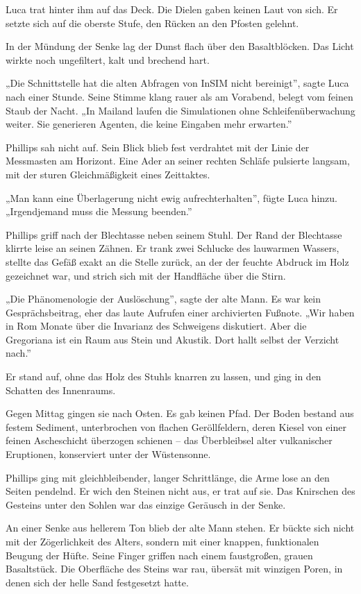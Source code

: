 \documentclass[
  ngerman,
]{article}
\begin{document}
Luca trat hinter ihm auf das Deck. Die Dielen gaben keinen Laut von
sich. Er setzte sich auf die oberste Stufe, den Rücken an den Pfosten
gelehnt.

In der Mündung der Senke lag der Dunst flach über den Basaltblöcken. Das
Licht wirkte noch ungefiltert, kalt und brechend hart.

„Die Schnittstelle hat die alten Abfragen von InSIM nicht bereinigt'',
sagte Luca nach einer Stunde. Seine Stimme klang rauer als am Vorabend,
belegt vom feinen Staub der Nacht. „In Mailand laufen die Simulationen
ohne Schleifenüberwachung weiter. Sie generieren Agenten, die keine
Eingaben mehr erwarten.''

Phillips sah nicht auf. Sein Blick blieb fest verdrahtet mit der Linie
der Messmasten am Horizont. Eine Ader an seiner rechten Schläfe
pulsierte langsam, mit der sturen Gleichmäßigkeit eines Zeittaktes.

„Man kann eine Überlagerung nicht ewig aufrechterhalten'', fügte Luca
hinzu. „Irgendjemand muss die Messung beenden.''

Phillips griff nach der Blechtasse neben seinem Stuhl. Der Rand der
Blechtasse klirrte leise an seinen Zähnen. Er trank zwei Schlucke des
lauwarmen Wassers, stellte das Gefäß exakt an die Stelle zurück, an der
der feuchte Abdruck im Holz gezeichnet war, und strich sich mit der
Handfläche über die Stirn.

„Die Phänomenologie der Auslöschung'', sagte der alte Mann. Es war kein
Gesprächsbeitrag, eher das laute Aufrufen einer archivierten Fußnote.
„Wir haben in Rom Monate über die Invarianz des Schweigens diskutiert.
Aber die Gregoriana ist ein Raum aus Stein und Akustik. Dort hallt
selbst der Verzicht nach.''

Er stand auf, ohne das Holz des Stuhls knarren zu lassen, und ging in
den Schatten des Innenraums.

Gegen Mittag gingen sie nach Osten. Es gab keinen Pfad. Der Boden
bestand aus festem Sediment, unterbrochen von flachen Geröllfeldern,
deren Kiesel von einer feinen Ascheschicht überzogen schienen -- das
Überbleibsel alter vulkanischer Eruptionen, konserviert unter der
Wüstensonne.

Phillips ging mit gleichbleibender, langer Schrittlänge, die Arme lose
an den Seiten pendelnd. Er wich den Steinen nicht aus, er trat auf sie.
Das Knirschen des Gesteins unter den Sohlen war das einzige Geräusch in
der Senke.

An einer Senke aus hellerem Ton blieb der alte Mann stehen. Er bückte
sich nicht mit der Zögerlichkeit des Alters, sondern mit einer knappen,
funktionalen Beugung der Hüfte. Seine Finger griffen nach einem
faustgroßen, grauen Basaltstück. Die Oberfläche des Steins war rau,
übersät mit winzigen Poren, in denen sich der helle Sand festgesetzt
hatte.
\end{document}

